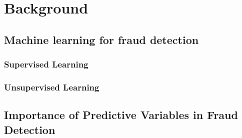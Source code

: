 \chapter{Background}
\label{chapter2}

\section{Machine learning for fraud detection}

\subsection{Supervised Learning}

\subsection{Unsupervised Learning}

\section{Importance of Predictive Variables in Fraud Detection}
\lipsum[1-1] \cite{smith2009research}